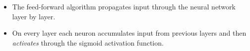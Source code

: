 \documentclass{beamer}
\def\layersep{2cm}
\begin{document}
\begin{frame}
\begin{figure}
        \end{figure}
        \begin{itemize}
          \item The feed-forward algorithm propagates input through the neural network
          layer by layer.
          \item On every layer each neuron accumulates input from previous layers
          and then \emph{activates} through the sigmoid activation function.
        \end{itemize}
    \end{frame}
\end{document}
